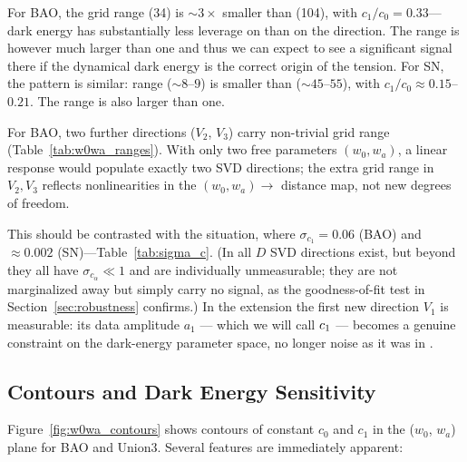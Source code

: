 For BAO, the \cone grid range (34) is $\sim 3\times$ smaller than \czero (104), with $c_1/c_0 = 0.33$---dark energy has substantially less leverage on \cone than on the \omh direction. The range is however much larger than one and thus we can expect to see a significant signal there if the dynamical dark energy is the correct origin of the tension. For SN, the pattern is similar: \cone range ($\sim 8$--$9$) is smaller than \czero ($\sim 45$--$55$), with $c_1/c_0 \approx 0.15$--$0.21$. The range is also larger than one. 

For BAO, two further directions ($V_2$, $V_3$) carry non-trivial grid range (Table~\ref{tab:w0wa_ranges}). With only two free parameters $(w_0, w_a)$, a linear response would populate exactly two SVD directions; the extra grid range in $V_2, V_3$ reflects nonlinearities in the $(w_0, w_a) \to$ distance map, not new degrees of freedom.

This should be contrasted with the \LCDM situation, where $\sigma_{c_1} = 0.06$ (BAO) and $\approx 0.002$ (SN)---Table~\ref{tab:sigma_c}. (In \LCDM all $D$ SVD directions exist, but beyond \czero they all have $\sigma_{c_\alpha} \ll 1$ and are individually unmeasurable; they are not marginalized away but simply carry no signal, as the goodness-of-fit test in Section~\ref{sec:robustness} confirms.) In the \wowa extension the first new direction $V_1$ is measurable: its data amplitude $a_1$ --- which we will call $c_1$ --- becomes a genuine constraint on the dark-energy parameter space, no longer noise as it was in \LCDM.

\subsection{\wowa Contours and Dark Energy Sensitivity}
\label{sec:w0wa_contours}

Figure~\ref{fig:w0wa_contours} shows contours of constant $c_0$ and $c_1$ in the ($w_0$, $w_a$) plane for BAO and Union3. Several features are immediately apparent:

